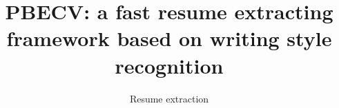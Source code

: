 \documentclass{acm_proc_article-sp}
\begin{document}
\title{PBECV: a fast resume extracting framework based on writing style recognition}
\subtitle{Resume extraction}

%
%
%
%
%

%
%
%
\end{document}
